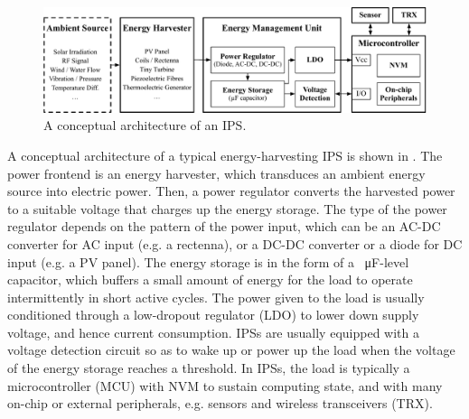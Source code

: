 \begin{figure}
  \centering
  \includegraphics[width=\columnwidth]{ch1_intro/figures/IPSarch}
  \caption{A conceptual architecture of an IPS.}
  \label{fig:ips_arch}
\end{figure}

A conceptual architecture of a typical energy-harvesting IPS is shown in .
The power frontend is an energy harvester, which transduces an ambient energy source into electric power. 
Then, a power regulator converts the harvested power to a suitable voltage that charges up the energy storage.
The type of the power regulator depends on the pattern of the power input, which can be an AC-DC converter for AC input (e.g. a rectenna), or a DC-DC converter or a diode for DC input (e.g. a PV panel). 
The energy storage is in the form of a \SI{}{\micro\farad}-level capacitor, which buffers a small amount of energy for the load to operate intermittently in short active cycles.
The power given to the load is usually conditioned through a low-dropout regulator (LDO) to lower down supply voltage, and hence current consumption. 
IPSs are usually equipped with a voltage detection circuit so as to wake up or power up the load when the voltage of the energy storage reaches a threshold. 
In IPSs, the load is typically a microcontroller (MCU) with NVM to sustain computing state, and with many on-chip or external peripherals, e.g. sensors and wireless transceivers (TRX). 




